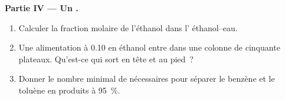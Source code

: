\begin{problem}
\medskip
\noindent\textbf{Partie IV --- Un .}
\begin{enumerate}[resume]
  \item Calculer la fraction molaire de l'éthanol dans l' éthanol--eau.
  \item Une alimentation à 0.10 en éthanol entre dans une colonne de cinquante plateaux. Qu'est-ce qui sort
        en tête et au pied~?
  \item Donner le nombre minimal de  nécessaires pour séparer
        le benzène et le toluène en produits à 95~\%.
\end{enumerate}
\end{problem}
